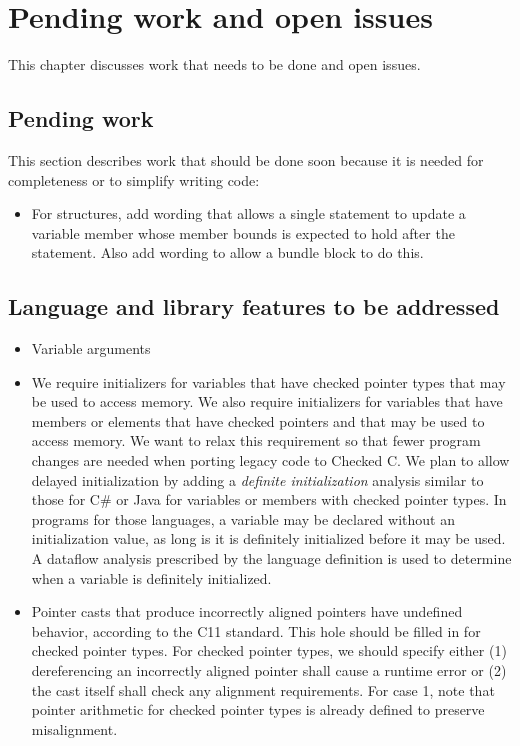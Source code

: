 
\chapter{Pending work and open issues}
\label{chapter:open-issues}

This chapter discusses work that needs to be done and open issues.

\section{Pending work}

This section describes work that should be done soon because it is
needed for completeness or to simplify writing code:
\begin{itemize}
\item For structures, add wording that allows a single statement  
to update a variable member whose member bounds is expected to hold after
the statement.  Also add wording to allow a bundle block to do this.
\end{itemize}

\section{Language and library features to be addressed}

\begin{itemize}
\item
  Variable arguments
\item  We require initializers for variables that have checked pointer types that may
be used to access memory.  We also require initializers for variables that have members
or elements that have checked pointers and that may be used to access memory.
We want to relax this requirement so that fewer program changes are needed when 
porting legacy code to Checked C.  We plan to allow delayed initialization by adding a
{\em definite initialization} analysis
similar to those for C\# or Java for variables or members with checked pointer types.
In programs for those languages, a variable may be declared without an initialization value, as
long is it is definitely initialized before it may be used.  A dataflow analysis prescribed by the
language definition is used to determine when a variable is definitely initialized.
\item
  Pointer casts that produce incorrectly aligned pointers have undefined
  behavior, according to the C11 standard. This hole should be filled in
  for checked pointer types. For checked pointer types, we should specify
  either (1) dereferencing an incorrectly aligned pointer shall cause a
  runtime error or (2) the cast itself shall check any alignment
  requirements. For case 1, note that pointer arithmetic for checked pointer types
  is already
  defined to preserve misalignment.

\end{itemize}

